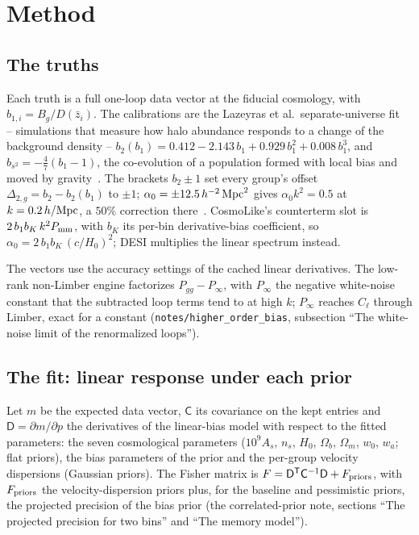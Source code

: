 \documentclass[11pt]{article}
\newcommand{\Cov}{\mathsf{C}}
\newcommand{\T}{^{\mathsf{T}}}
\newcommand{\hMpc}{\,h/{\rm Mpc}}
\begin{document}
\clearpage

\appendix

\section{Method}
\label{app:method}

\subsection{The truths}
\label{sec:truths}

Each truth is a full one-loop data vector at the fiducial cosmology,
with $b_{1,i} = B_g/D(\bar{z}_i)$.  The calibrations are the Lazeyras
et al.\ separate-universe fit~\cite{Lazeyras2016} -- simulations that
measure how halo abundance responds to a change of the background
density --
$b_2(b_1) = 0.412 - 2.143\,b_1 + 0.929\,b_1^2 + 0.008\,b_1^3$, and
$b_{s^2} = -\tfrac{4}{7}(b_1 - 1)$, the co-evolution of a population
formed with local bias and moved by gravity~\cite{Saito2014}.  The
brackets $b_2 \pm 1$ set every group's offset
$\Delta_{2,g} = b_2 - b_2(b_1)$ to $\pm 1$;
$\alpha_0 = \pm 12.5\,h^{-2}\,{\rm Mpc}^2$ gives $\alpha_0 k^2 = 0.5$
at $k = 0.2\hMpc$, a $50\%$ correction there~\cite{Maus2024}.
CosmoLike's counterterm slot is $2\,b_1 b_K\,k^2 P_{\rm mm}$, with
$b_K$ its per-bin derivative-bias coefficient, so
$\alpha_0 = 2\,b_1 b_K\,(c/H_0)^2$; DESI multiplies the linear
spectrum instead.

The vectors use the accuracy settings of the cached linear
derivatives.  The low-rank non-Limber engine factorizes
$P_{gg} - P_\infty$, with $P_\infty$ the negative white-noise constant
that the subtracted loop terms tend to at high $k$; $P_\infty$ reaches
$C_\ell$ through Limber, exact for a constant
(\texttt{notes/higher\_order\_bias}, subsection ``The white-noise
limit of the renormalized loops'').

\subsection{The fit: linear response under each prior}
\label{sec:response}

Let $m$ be the expected data vector, $\Cov$ its covariance on the
kept entries and $\mathsf{D} = \partial m/\partial p$ the derivatives
of the linear-bias model with respect to the fitted parameters: the
seven cosmological parameters ($10^9 A_s$, $n_s$, $H_0$, $\Omega_b$,
$\Omega_m$, $w_0$, $w_a$; flat priors), the bias parameters of the
prior and the per-group velocity dispersions (Gaussian priors).  The
Fisher matrix is
$F = \mathsf{D}\T \Cov^{-1} \mathsf{D} + F_{\rm priors}$, with
$F_{\rm priors}$ the velocity-dispersion priors plus, for the baseline
and pessimistic priors, the projected precision of the bias prior (the
correlated-prior note, sections ``The projected precision for two
bins'' and ``The memory model'').
\end{document}
